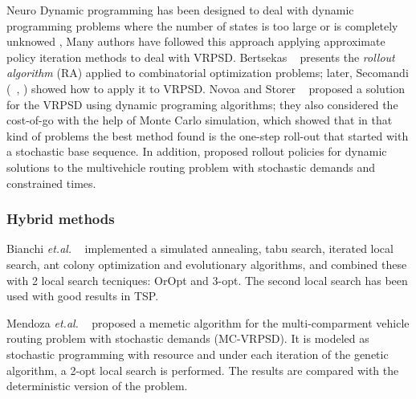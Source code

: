 Neuro Dynamic programming has been designed to deal with dynamic programming problems where the number of states is too large or is completely unknowed \cite{Bertsekas1996}, Many authors have followed this approach applying approximate policy iteration methods to deal with VRPSD. 
Bertsekas ~\cite{Bertsekas1997} presents the \textit{rollout algorithm} (RA) applied to combinatorial optimization problems; later, Secomandi (~\cite{Secomandi_1998}, \cite{secomandi_rollout_2001}) showed how to apply it to VRPSD. Novoa and Storer ~\cite{novoa_approximate_2009} proposed a solution for the VRPSD using dynamic programing algorithms; they also considered the cost-of-go with the help of Monte Carlo simulation, which showed that in that kind of problems the best method found is the one-step roll-out that started with a stochastic base sequence. In addition, \cite{Goodson2013} proposed rollout policies for dynamic solutions to the multivehicle routing problem with stochastic demands and constrained times.











\subsubsection{Hybrid methods}

Bianchi \textit{et.al.} ~\cite{bianchi_hybrid_2006} implemented a simulated annealing, tabu search, iterated local search, ant colony optimization and evolutionary algorithms, and combined these with 2 local search tecniques: OrOpt and 3-opt. The second local search has been used with good results in TSP.

Mendoza \textit{et.al.} ~\cite{mendoza_memetic_2010} proposed a memetic algorithm for the multi-comparment vehicle routing problem with stochastic demands (MC-VRPSD). It is modeled as stochastic programming with resource and under each iteration of the genetic algorithm, a 2-opt local search is performed. The results are compared with the deterministic version of the problem.

